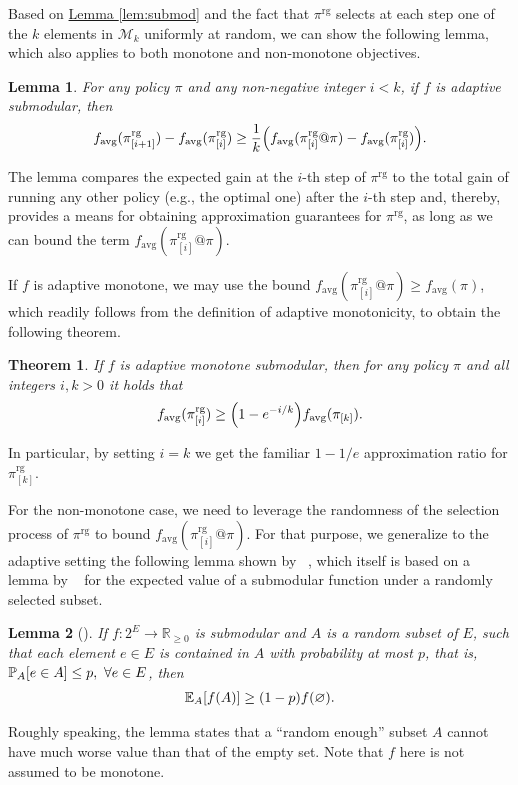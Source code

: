 \documentclass{article}
\newcommand{\lemmaref}[1]{\hyperref[#1]{Lemma \ref*{#1}}}
\newtheorem{theorem}{Theorem}
\newtheorem{lemma}{Lemma}
\let\originalleft\left
\let\originalright\right
\renewcommand{\left}{\mathopen{}\mathclose\bgroup\originalleft}
\renewcommand{\right}{\aftergroup\egroup\originalright}
\newcommand{\pik}{\pi_{[k]}}
\newcommand{\pig}{\pi^{\textrm{rg}}}
\newcommand{\pigi}{\pi^{\textrm{rg}}_{[i]}}
\newcommand{\pigii}{\pi^{\textrm{rg}}_{[i+1]}}
\newcommand{\pigk}{\pi^{\textrm{rg}}_{[k]}}
\newcommand{\favg}{f_{\mathrm{avg}}}
\newcommand{\Mk}{\mathcal{M}_k}
\newcommand{\citet}[1]{\citeauthor{#1}~\shortcite{#1}}
\begin{document}
Based on \lemmaref{lem:submod} and the fact that $\pig$ selects at each step one of the $k$ elements in $\Mk$ uniformly at random, we can show the following lemma, which also applies to both monotone and non-monotone objectives.
\begin{lemma}\label{lem:mon_main}
  For any policy $\pi$ and any non-negative integer $i < k$, if $f$ is adaptive submodular, then
  \begin{align*}
    \favg(\pigii) - \favg(\pigi) \geq \frac{1}{k}\left(\favg(\pigi @ \pi) - \favg(\pigi)\right).
  \end{align*}
\end{lemma}
\noindent The lemma compares the expected gain at the $i$-th step of $\pig$ to the total gain of running any other policy (e.g., the optimal one) after the $i$-th step and, thereby, provides a means for obtaining approximation guarantees for $\pig$, as long as we can bound the term $\favg(\pigi @ \pi)$.

If $f$ is adaptive monotone, we may use the bound $\favg(\pigi @ \pi) \geq \favg(\pi)$, which readily follows from the definition of adaptive monotonicity, to obtain the following theorem.
\begin{theorem}
  If $f$ is adaptive monotone submodular, then for any policy $\pi$ and all integers $i, k > 0$ it holds that
  \begin{align*}
    \favg(\pigi) \geq \left(1 - e^{-i/k}\right)\favg(\pik).
  \end{align*}
\end{theorem}
\noindent In particular, by setting $i = k$ we get the familiar $1-1/e$ approximation ratio for $\pigk$.

For the non-monotone case, we need to leverage the randomness of the selection process of $\pig$ to bound $\favg(\pigi @ \pi)$.
For that purpose, we generalize to the adaptive setting the following lemma shown by \citet{buchbinder14}, which itself is based on a lemma by \citet{feige07} for the expected value of a submodular function under a randomly selected subset.
\begin{lemma}[\cite{buchbinder14}]
  If $f : 2^E \to \mathbb{R}_{\geq 0}$ is submodular and $A$ is a random subset of $E$, such that each element $e \in E$ is contained in $A$ with probability at most $p$, that is, $\P[A]{e \in A} \leq p,\ \forall e \in E$, then
  \begin{align*}
    \E[A]{f(A)} \geq (1-p)f(\varnothing).
  \end{align*}
\end{lemma}
\noindent Roughly speaking, the lemma states that a ``random enough'' subset $A$ cannot have much worse value than that of the empty set.
Note that $f$ here is not assumed to be monotone.
\end{document}

